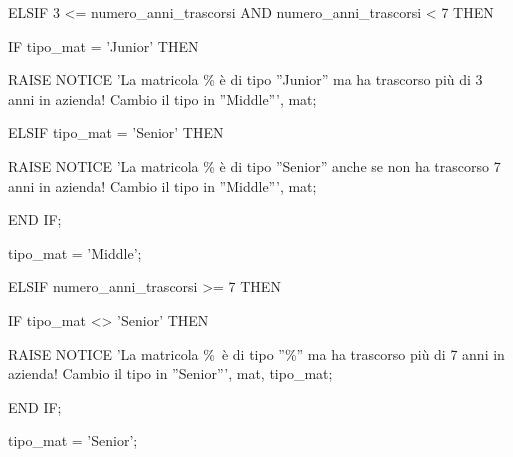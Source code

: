 \begin{flushleft}
\begin{description}
\begin{description}
                                        \item ELSIF 3 <= numero\_anni\_trascorsi AND numero\_anni\_trascorsi < 7 THEN
                                        \begin{description}
                                            \item IF tipo\_mat = 'Junior' THEN
                                            \begin{description}
                                                \item RAISE NOTICE 'La matricola \% \`e di tipo ''Junior'' ma ha trascorso pi\`u di 3 anni in azienda! Cambio il tipo in ''Middle''', mat;
                                            \end{description}
                                            \item ELSIF tipo\_mat = 'Senior' THEN
                                             \begin{description}
                                                \item RAISE NOTICE 'La matricola \% \`e di tipo ''Senior'' anche se non ha trascorso 7 anni in azienda! Cambio il tipo in ''Middle''', mat;
                                            \end{description}
                                            \item END IF;
                                            \item tipo\_mat = 'Middle';
                                        \end{description}

                                        \item ELSIF numero\_anni\_trascorsi >= 7 THEN
                                        \begin{description}
                                            \item IF tipo\_mat <> 'Senior' THEN
                                            \begin{description}
                                                \item RAISE NOTICE 'La matricola \%\ \`e di tipo ''\%'' ma ha trascorso pi\`u di 7 anni in azienda! Cambio il tipo in ''Senior''', mat, tipo\_mat;    
                                            \end{description}
                                            \item END IF;
                                            \item tipo\_mat = 'Senior';
                                        \end{description}
                                            

\end{description}
\end{description}
\end{flushleft}
